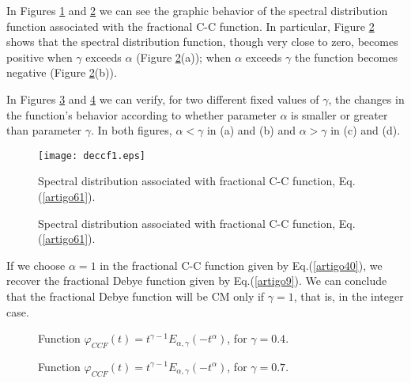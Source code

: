 \documentclass[12pt]{amsart}
\numberwithin{equation}{section}
\begin{document}
\begin{itemize}
In Figures \ref{artigo32} and \ref{artigo33} we can see the graphic
behavior of the spectral distribution function associated with the
fractional C-C function. In particular, Figure \ref{artigo33} shows that
the spectral distribution function, though very close to zero, becomes
positive when $\gamma$ exceeds $\alpha$ (Figure \ref{artigo33}(a)); when
$\alpha$ exceeds $\gamma$ the function becomes negative (Figure
\ref{artigo33}(b)). 

In Figures \ref{artigo7} and \ref{artigo8} we can verify, for two different
fixed values of $\gamma$, the changes in the function's behavior according
to whether parameter $\alpha$ is smaller or greater than parameter
$\gamma$. In both figures, $\alpha < \gamma$ in (a) and (b) and $\alpha >
\gamma$ in (c) and (d). 

\begin{figure}[H]
\center
\texttt{[image: deccf1.eps]}
\caption{Spectral distribution associated with fractional C-C function,
	Eq.(\ref{artigo61}).}
\label{artigo32}
\end{figure}
\begin{figure}[H]
\center
{}
\qquad
{}
\caption{Spectral distribution associated with fractional C-C function,
	Eq.(\ref{artigo61}).}
\label{artigo33}
\end{figure}

\noindent If we choose $\alpha =1$ in the fractional C-C function given by
Eq.(\ref{artigo40}), we recover the fractional Debye function given by
Eq.(\ref{artigo9}). We can conclude that the fractional Debye function will be CM only if
$\gamma =1$, that is, in the integer case.
\begin{figure}[H]
\center
{}
\qquad
{}
\qquad
{}
\qquad
{}
\caption{Function $\varphi_{CCF}(t)=
	t^{\gamma-1}E_{\alpha,\gamma}(-t^\alpha)$, for $\gamma=0.4$.}
\label{artigo7}
\end{figure}
\begin{figure}[H]
\center
{}
\qquad
{}
\qquad
{}
\qquad
{}
\caption{Function $\varphi_{CCF}(t)=
	t^{\gamma-1}E_{\alpha,\gamma}(-t^\alpha)$, for $\gamma=0.7$.}
\label{artigo8}
\end{figure}


\end{itemize}
\end{document}
